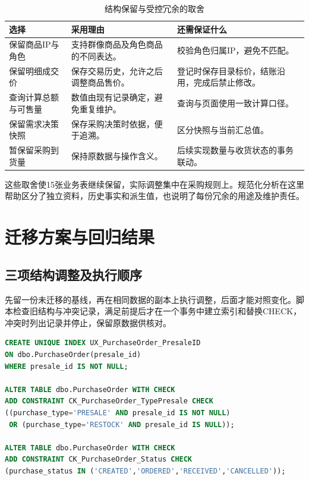 \documentclass{SYSUReport}
\begin{document}
\begin{table}[H]\centering\small
\begin{tabularx}{\textwidth}{P{3.4cm}Y P{3.2cm}}
\toprule 选择 & 采用理由 & 还需保证什么 \\
\midrule
保留商品IP与角色 & 支持群像商品及角色商品的不同表达。 & 校验角色归属IP，避免不匹配。 \\
保留明细成交价 & 保存交易历史，允许之后调整商品售价。 & 登记时保存目录标价，结账沿用，完成后禁止修改。 \\
查询计算总额与可售量 & 数值由现有记录确定，避免重复维护。 & 查询与页面使用一致计算口径。 \\
保留需求决策快照 & 保存采购决策时依据，便于追溯。 & 区分快照与当前汇总值。 \\
暂保留采购到货量 & 保持原数据与操作含义。 & 后续实现数量与收货状态的事务联动。 \\
\bottomrule
\end{tabularx}\caption{结构保留与受控冗余的取舍}
\end{table}

这些取舍使15张业务表继续保留，实际调整集中在采购规则上。规范化分析在这里帮助区分了独立资料，历史事实和派生值，也说明了每份冗余的用途及维护责任。

\clearpage
\section{迁移方案与回归结果}
\subsection{三项结构调整及执行顺序}
先留一份未迁移的基线，再在相同数据的副本上执行调整，后面才能对照变化。脚本检查旧结构与冲突记录，满足前提后才在一个事务中建立索引和替换CHECK，冲突时列出记录并停止，保留原数据供核对。

\begin{lstlisting}[language=SQL]
CREATE UNIQUE INDEX UX_PurchaseOrder_PresaleID
ON dbo.PurchaseOrder(presale_id)
WHERE presale_id IS NOT NULL;

ALTER TABLE dbo.PurchaseOrder WITH CHECK
ADD CONSTRAINT CK_PurchaseOrder_TypePresale CHECK
((purchase_type='PRESALE' AND presale_id IS NOT NULL)
 OR (purchase_type='RESTOCK' AND presale_id IS NULL));

ALTER TABLE dbo.PurchaseOrder WITH CHECK
ADD CONSTRAINT CK_PurchaseOrder_Status CHECK
(purchase_status IN ('CREATED','ORDERED','RECEIVED','CANCELLED'));
\end{lstlisting}
\end{document}
